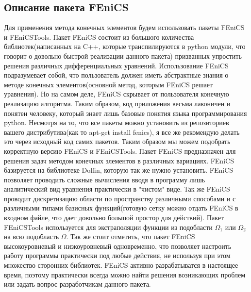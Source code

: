 \subsection{Описание пакета FEniCS}

Для применения метода конечных элементов будем использовать пакеты FEniCS и FEniCSTools.
Пакет FEniCS состоит из большого количества библиотек(написанных на C++, которые транспилируются в python модули, что говорит о довольно быстрой реализации данного пакета) призванных упростить решения различных дифференциальных уравнений. 
Использование FEniCS подразумевает собой, что пользователь должен иметь абстрактные знания о методе конечных элементов(основной метод, которым FEniCS решает уравнения). Но на самом деле, FEniCS скрывает от пользователя конечную реализацию алгоритма. Таким образом, код приложения весьма лаконичен и понятен человеку, который знает лишь базовые понятия языка программирования python.
Несмотря на то, что все пакеты можно установить из репозиториев вашего дистрибутива(как то apt-get install fenics), я все же рекомендую делать это через исходный код самих пакетов. Таким образом мы можем подобрать корректную версию FEniCS и FEniCSTools.
Пакет FEniCS предназначен для решения задач методом конечных элементов в различных вариациях. 
FEniCS базируется на библиотеке Dolfin, которую так же нужно установить. FEniCS позволяет проводить сложные вычисления
вводя в программу лишь аналитический вид уравнения практически в "чистом" виде. Так же FEniCS проводит
дискретизацию области по пространству различными способами и с различными типами базисных функций(готовую
 сетку можно отдать FEniCS в входном файле, что дает довольно большой простор для действий). Пакет FEniCSTools используется
для экстраполяции функции из подобласти $\Omega_1$ или $\Omega_2$ на всю подобласть $\Omega$. Так же стоит
отметить, что пакет FEniCS высокоуровневый и низкоуровневый одновременно, что позволяет настроить работу программы
практически под любые действия, не используя при этом множество сторонних библиотек. FEniCS активно разрабатыватся в настоящее
время, поэтому практически всегда можно найти решения возникающих проблем или задать вопрос разработчикам данного пакета.
